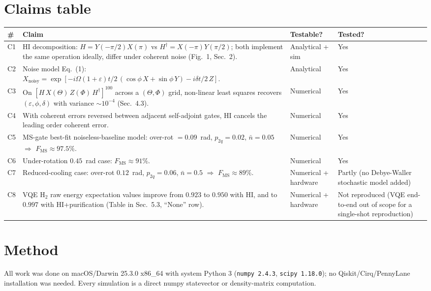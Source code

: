 \documentclass[11pt]{article}
\begin{document}
\section{Claims table}
\begin{tabular}{p{0.6cm} p{7.5cm} p{2.4cm} p{2.4cm}}
\toprule
\# & Claim & Testable? & Tested? \\ \midrule
C1 & HI decomposition: $H=Y(-\pi/2)X(\pi)$ vs $H^{\dagger}=X(-\pi)Y(\pi/2)$; both implement the same operation ideally, differ under coherent noise (Fig.~1, Sec.~2). & Analytical + sim & Yes \\
C2 & Noise model Eq.~(1): $X_{\text{noisy}}=\exp[-i\Omega(1+\varepsilon)t/2\,(\cos\phi\, X+\sin\phi\, Y) - i\delta t/2\,Z]$. & Analytical & Yes \\
C3 & On $[H\,X(\Theta)\,Z(\Phi)\,H^{\dagger}]^{100}$ across a $(\Theta,\Phi)$ grid, non-linear least squares recovers $(\varepsilon,\phi,\delta)$ with variance $\sim 10^{-4}$ (Sec.~4.3). & Numerical & Yes \\
C4 & With coherent errors reversed between adjacent self-adjoint gates, HI cancels the leading order coherent error. & Numerical & Yes \\
C5 & MS-gate best-fit noiseless-baseline model: over-rot $=0.09$~rad, $p_{2q}=0.02$, $\bar n=0.05$ $\Rightarrow$ $F_{\text{MS}}\approx 97.5\%$. & Numerical & Yes \\
C6 & Under-rotation $0.45$~rad case: $F_{\text{MS}}\approx 91\%$. & Numerical & Yes \\
C7 & Reduced-cooling case: over-rot $0.12$~rad, $p_{2q}=0.06$, $\bar n=0.5$ $\Rightarrow$ $F_{\text{MS}}\approx 89\%$. & Numerical + hardware & Partly (no Debye-Waller stochastic model added) \\
C8 & VQE H$_2$ raw energy expectation values improve from $0.923$ to $0.950$ with HI, and to $0.997$ with HI+purification (Table in Sec.~5.3, ``None'' row). & Numerical + hardware & Not reproduced (VQE end-to-end out of scope for a single-shot reproduction) \\ \bottomrule
\end{tabular}

\section{Method}
All work was done on macOS/Darwin 25.3.0 x86\_64 with system Python 3 (\texttt{numpy 2.4.3}, \texttt{scipy 1.18.0}); no Qiskit/Cirq/PennyLane installation was needed. Every simulation is a direct numpy statevector or density-matrix computation.
\end{document}
